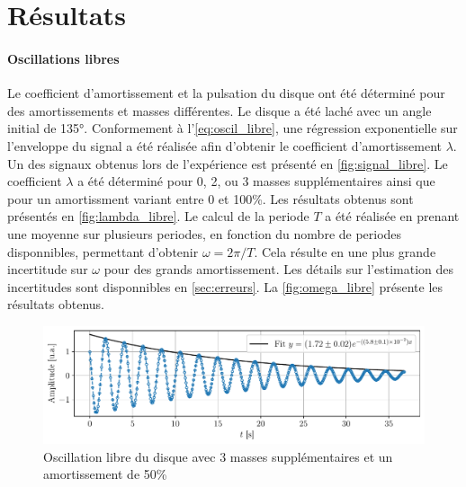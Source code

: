 \section{Résultats}

\paragraph{Oscillations libres}
Le coefficient d'amortissement et la pulsation du disque ont été déterminé pour des amortissements et masses différentes. Le disque a été laché avec un angle initial de 135°. Conformement à l'\autoref{eq:oscil_libre}, une régression exponentielle sur l'enveloppe du signal a été réalisée afin d'obtenir le coefficient d'amortissement \(\lambda\). Un des signaux obtenus lors de l'expérience est présenté en \autoref{fig:signal_libre}. Le coefficient \(\lambda\) a été déterminé pour 0, 2, ou 3 masses supplémentaires ainsi que pour un amortissment variant entre 0 et 100\%. Les résultats obtenus sont présentés en \autoref{fig:lambda_libre}. Le calcul de la periode \(T\) a été réalisée en prenant une moyenne sur plusieurs periodes, en fonction du nombre de periodes disponnibles, permettant d'obtenir \(\omega = 2 \pi / T\). Cela résulte en une plus grande incertitude sur \(\omega\) pour des grands amortissement. Les détails sur l'estimation des incertitudes sont disponnibles en \autoref{sec:erreurs}. La \autoref{fig:omega_libre} présente les résultats obtenus.

\begin{figure}[h]
    \centering
    \includegraphics[width=0.98\linewidth]{figures/I3_50_nomot_fitted.pdf}
    \caption{Oscillation libre du disque avec 3 masses supplémentaires et un amortissement de 50\%}
    \label{fig:signal_libre}
\end{figure}

